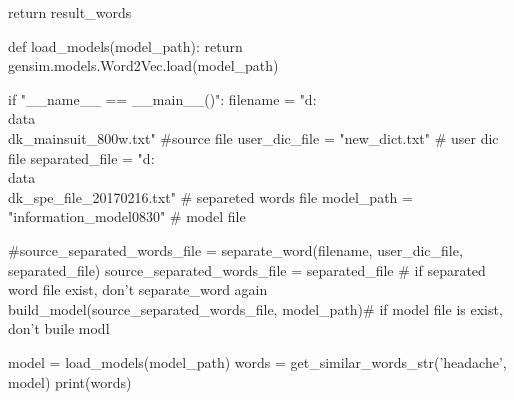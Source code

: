 \begin{python}
    return result_words

def load_models(model_path):
    return gensim.models.Word2Vec.load(model_path)

if "__name__ == __main__()":
    filename = "d:\\data\\dk_mainsuit_800w.txt" #source file
    user_dic_file = "new_dict.txt" # user dic file
    separated_file = "d:\\data\\dk_spe_file_20170216.txt" # separeted words file
    model_path = "information_model0830" # model file
    
    #source_separated_words_file = separate_word(filename, user_dic_file, separated_file)
    source_separated_words_file = separated_file    # if separated word file exist, don't separate_word again
    build_model(source_separated_words_file, model_path)# if model file is exist, don't buile modl 

    model = load_models(model_path)
    words = get_similar_words_str('headache', model)
    print(words)
\end{python}